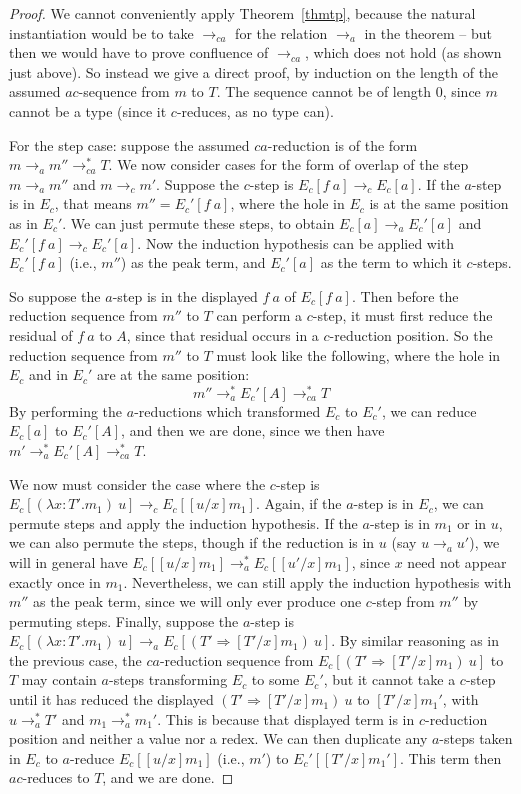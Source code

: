\documentclass{LMCS}
\newcommand{\To}[0]{\Rightarrow}
\begin{document}
\begin{proof}
We cannot conveniently apply Theorem~\ref{thmtp}, because the natural
instantiation would be to take $\to_{ca}$ for the relation $\to_a$ in
the theorem -- but then we would have to prove confluence of
$\to_{ca}$, which does not hold (as shown just above).  So instead we
give a direct proof, by induction on the length of the assumed
$ac$-sequence from $m$ to $T$.  The sequence cannot be of length $0$,
since $m$ cannot be a type (since it $c$-reduces, as no type can).

For the step case: suppose the assumed $ca$-reduction is of the form
$m \to_a m''\to_{ca}^* T$.  We now consider cases for the form of
overlap of the step $m\to_a m''$ and $m\to_c m'$.  Suppose the
$c$-step is $E_c[f\ a]\to_c E_c[a]$.  If the $a$-step is in $E_c$,
that means $m'' = E_c'[f\ a]$, where the hole in $E_c$ is at the same
position as in $E_c'$.  We can just permute these steps, to obtain
$E_c[a]\to_a E_c'[a]$ and $E_c'[f\ a]\to_c E_c'[a]$.  Now the
induction hypothesis can be applied with $E_c'[f\ a]$ (i.e., $m''$) as
the peak term, and $E_c'[a]$ as the term to which it $c$-steps.  

So suppose the $a$-step is in the displayed $f\ a$ of $E_c[f\ a]$.
Then before the reduction sequence from $m''$ to $T$ can perform a
$c$-step, it must first reduce the residual of $f\ a$ to $A$, since
that residual occurs in a $c$-reduction position.  So the reduction
sequence from $m''$ to $T$ must look like the following, where the
hole in $E_c$ and in $E_c'$ are at the same position:
\[
m'' \to_a^* E_c'[A] \to_{ca}^* T
\]
\noindent By performing the $a$-reductions which transformed $E_c$ to
$E_c'$, we can reduce $E_c[a]$ to $E_c'[A]$, and then we are done,
since we then have $m'\to_a^* E_c'[A]\to_{ca}^* T$.

We now must consider the case where the $c$-step is $E_c[(\lambda
  x:T'.m_1)\ u]\to_c E_c[[u/x]m_1]$.  Again, if the $a$-step is in
$E_c$, we can permute steps and apply the induction hypothesis.  If
the $a$-step is in $m_1$ or in $u$, we can also permute the steps,
though if the reduction is in $u$ (say $u\to_a u'$), we will in
general have $E_c[[u/x]m_1]\to_a^* E_c[[u'/x]m_1]$, since $x$ need not
appear exactly once in $m_1$.  Nevertheless, we can still apply the
induction hypothesis with $m''$ as the peak term, since we will only
ever produce one $c$-step from $m''$ by permuting steps.  Finally,
suppose the $a$-step is $E_c[(\lambda x:T'.m_1)\ u]\to_a E_c[(T'\To
  [T'/x]m_1)\ u]$.  By similar reasoning as in the previous case, the
$ca$-reduction sequence from $E_c[(T'\To [T'/x]m_1)\ u]$ to $T$ may
contain $a$-steps transforming $E_c$ to some $E_c'$, but it cannot
take a $c$-step until it has reduced the displayed $(T'\To
[T'/x]m_1)\ u$ to $[T'/x]m_1'$, with $u\to_a^* T'$ and $m_1\to_a^*
m_1'$.  This is because that displayed term is in $c$-reduction
position and neither a value nor a redex.  We can then duplicate any
$a$-steps taken in $E_c$ to $a$-reduce $E_c[[u/x]m_1]$ (i.e., $m'$) to
$E_c'[[T'/x]m_1']$.  This term then $ac$-reduces to $T$, and we are
done.
\end{proof}
\end{document}
